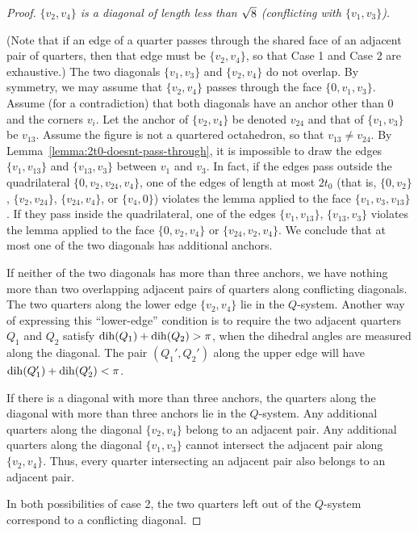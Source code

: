 \begin{proof}
  {\it $\{v_2,v_4\}$ is a diagonal of
length less than $\sqrt8$ (conflicting with $\{v_1,v_3\}$).}

(Note that if an edge of a quarter passes through the shared face
of an adjacent pair of quarters, then that edge must be
$\{v_2,v_4\}$, so that Case 1 and Case 2 are exhaustive.) The two
diagonals $\{v_1,v_3\}$ and $\{v_2,v_4\}$ do not overlap. By
symmetry, we may assume that $\{v_2,v_4\}$ passes through the face
$\{0,v_1,v_3\}$. Assume (for a contradiction) that both diagonals
have an anchor other than $0$ and the corners $v_i$. Let the
anchor of $\{v_2,v_4\}$ be denoted $v_{24}$ and that of
$\{v_1,v_3\}$ be $v_{13}$. Assume the figure is not a quartered
octahedron, so that $v_{13}\ne v_{24}$. By
Lemma~\ref{lemma:2t0-doesnt-pass-through}, it is impossible to
draw the edges $\{v_1,v_{13}\}$ and $\{v_{13},v_3\}$ between $v_1$
and $v_3$.  In fact, if the edges pass outside the quadrilateral
$\{0,v_2,v_{24},v_4\}$, one of the edges of length at most $2t_0$
(that is,
    $\{0,v_2\}$, $\{v_2,v_{24}\}$, $\{v_{24},v_4\}$,
or $\{v_4,0\}$) violates the lemma applied to the face
$\{v_1,v_3,v_{13}\}$. If they pass inside the quadrilateral, one of the
edges $\{v_1,v_{13}\}$, $\{v_{13},v_3\}$ violates the lemma applied to
the face
    $\{0,v_{2},v_4\}$ or $\{v_{24},v_2,v_4\}$.
We conclude that at most one of the two diagonals has additional
anchors.

If neither of the two diagonals has more than three anchors, we
have nothing more than two overlapping adjacent pairs of quarters
along conflicting diagonals.  The two quarters along the lower
edge $\{v_2,v_4\}$ lie in the $Q$-system.  Another way of
expressing this ``lower-edge'' condition is to require the two
adjacent quarters $Q_1$ and $Q_2$ satisfy
$\operatorname{dih}(Q_1)+\operatorname{dih}(Q_2)>\pi$, when the dihedral angles are measured
along the diagonal. The pair $(Q_1',Q_2')$ along the upper edge
will have $\operatorname{dih}(Q_1')+\operatorname{dih}(Q_2')<\pi$.

If there is a diagonal with more than three anchors,  the quarters
along the diagonal with more than three anchors lie in the
$Q$-system.  Any additional quarters along the diagonal
$\{v_2,v_4\}$ belong to an adjacent pair. Any additional quarters
along the diagonal $\{v_1,v_3\}$ cannot intersect the adjacent
pair along $\{v_2,v_4\}$.  Thus, every quarter intersecting an
adjacent pair also belongs to an adjacent pair.

In both possibilities of case 2, the two quarters left out of the
$Q$-system correspond to a conflicting diagonal.
\end{proof}

